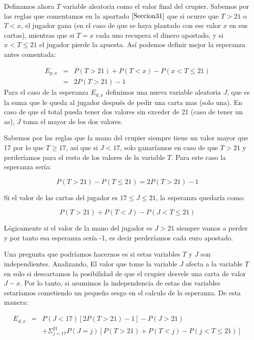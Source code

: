 \documentclass[12pt,a4paper,]{book}
\numberwithin{dummy}{section}
\theoremstyle{ocrenumbox}
\theoremstyle{blacknumex}
\theoremstyle{blacknumbox}
\theoremstyle{ocrenum}
\theoremstyle{ocrenum}
\begin{document}
Definamos ahora \(T\) variable aleatoria como el valor final del
crupier. Sabemos por las reglas que comentamos en la apartado
\(\ref{Seccion31}\) que si ocurre que \(T>21\) o \(T<x\), el jugador
gana (en el caso de que se haya plantado con ese valor \(x\) en sus
cartas), mientras que si \(T=x\) cada uno recupera el dinero apostado, y
si \(x < T \leq 21\) el jugador pierde la apuesta. Así podemos definir
mejor la esperanza antes comentada:

\[
\begin{array}{ccl}
E_{p,x} & = & P(T>21) + P(T<x) - P(x<T \leq 21) \\
        & = & 2P(T>21) -1
\end{array}
\] Para el caso de la esperanza \(E_{d,x}\) definimos una nueva variable
aleatoria \(J\), que es la suma que le queda al jugador después de pedir
una carta mas (solo una). En caso de que el total pueda tener dos
valores sin exceder de 21 (caso de tener un as), \(J\) toma el mayor de
los dos valores.

Sabemos por las reglas que la mano del crupier siempre tiene un valor
mayor que 17 por lo que \(T \geq 17\), así que si \(J<17\), solo
ganaríamos en caso de que \(T>21\) y perderíamos para el resto de los
valores de la variable \(T\). Para este caso la esperanza sería:

\[
P(T>21) - P(T \leq 21)= 2P(T>21) -1
\]

Si el valor de las cartas del jugador es \(17 \leq J \leq 21\), la
esperanza quedaría como:

\[
P(T>21) +P(T<J) - P(J < T \leq 21)
\]

Lógicamente si el valor de la mano del jugador es \(J>21\) siempre vamos
a perder y por tanto esa esperanza sería -1, es decir perderíamos cada
euro apostado.

Una pregunta que podríamos hacernos es si estas variables \(T\) y \(J\)
son independientes. Analizando, El valor que tome la variable \(J\)
afecta a la variable \(T\) en solo si descartamos la posibilidad de que
el crupier desvele una carta de valor \(J-x\). Por lo tanto, si asumimos
la independencia de estas dos variables estaríamos cometiendo un pequeño
sesgo en el calculo de la esperanza. De esta manera:

\[
\begin{array}{ccl}
E_{d,x} & = & P(J<17)[2P(T>21)-1] - P(J>21) \\
        &   & + \Sigma_{j=17}^21 P(J=j) [P(T>21) + P(T<j) - P(j<T \leq21)]
\end{array}
\]
\end{document}
